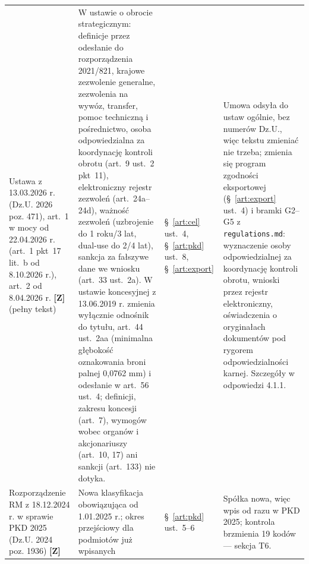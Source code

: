 \documentclass[12pt,a4paper]{report}
\newcommand{\Wiar}[1]{\textbf{[#1]}}
\begin{document}
\begin{longtable}{@{}p{3.1cm} p{3.7cm} p{3.3cm} p{4.4cm}@{}}
Ustawa z 13.03.2026 r. (Dz.U. 2026 poz. 471), art.~1 w mocy od 22.04.2026 r. (art.~1 pkt~17 lit.~b od 8.10.2026 r.), art.~2 od 8.04.2026 r. \Wiar{Z} (pełny tekst) & W ustawie o obrocie strategicznym: definicje przez odesłanie do rozporządzenia 2021/821, krajowe zezwolenie generalne, zezwolenia na wywóz, transfer, pomoc techniczną i pośrednictwo, osoba odpowiedzialna za koordynację kontroli obrotu (art.~9 ust.~2 pkt~11), elektroniczny rejestr zezwoleń (art.~24a--24d), ważność zezwoleń (uzbrojenie do 1 roku/3 lat, dual-use do 2/4 lat), sankcja za fałszywe dane we wniosku (art.~33 ust.~2a). W ustawie koncesyjnej z 13.06.2019 r. zmienia wyłącznie odnośnik do tytułu, art.~44 ust.~2aa (minimalna głębokość oznakowania broni palnej 0,0762 mm) i odesłanie w art.~56 ust.~4; definicji, zakresu koncesji (art.~7), wymogów wobec organów i akcjonariuszy (art.~10, 17) ani sankcji (art.~133) nie dotyka. & §~\ref{art:cel} ust.~4, §~\ref{art:pkd} ust.~8, §~\ref{art:export} & Umowa odsyła do ustaw ogólnie, bez numerów Dz.U., więc tekstu zmieniać nie trzeba; zmienia się program zgodności eksportowej (§~\ref{art:export} ust.~4) i bramki G2--G5 z \texttt{regulations.md}: wyznaczenie osoby odpowiedzialnej za koordynację kontroli obrotu, wnioski przez rejestr elektroniczny, oświadczenia o oryginałach dokumentów pod rygorem odpowiedzialności karnej. Szczegóły w odpowiedzi 4.1.1. \\
Rozporządzenie RM z 18.12.2024 r. w sprawie PKD 2025 (Dz.U. 2024 poz. 1936) \Wiar{Z} & Nowa klasyfikacja obowiązująca od 1.01.2025 r.; okres przejściowy dla podmiotów już wpisanych & §~\ref{art:pkd} ust.~5--6 & Spółka nowa, więc wpis od razu w PKD 2025; kontrola brzmienia 19 kodów --- sekcja T6. \\

\end{longtable}
\end{document}
